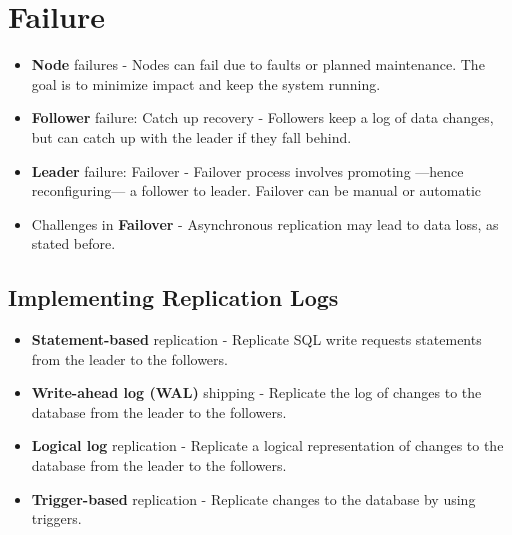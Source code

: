 \section{Failure}
\begin{itemize}
   \item \textbf{Node} failures - Nodes can fail due to faults or planned maintenance. The goal is to minimize impact and keep the system running.
   \item \textbf{Follower} failure: Catch up recovery - Followers keep a log of data changes, but can catch up with the leader if they fall behind.
   \item \textbf{Leader} failure: Failover - Failover process involves promoting ---hence reconfiguring--- a follower to leader. Failover can be manual or automatic
   \item Challenges in \textbf{Failover} - Asynchronous replication may lead to data loss, as stated before.
\end{itemize}

\subsection{Implementing Replication Logs}
\begin{itemize}
   \item \textbf{Statement-based} replication - Replicate SQL write requests statements from the leader to the followers.
   \item \textbf{Write-ahead log (WAL)} shipping - Replicate the log of changes to the database from the leader to the followers.
   \item \textbf{Logical log} replication - Replicate a logical representation of changes to the database from the leader to the followers.
   \item \textbf{Trigger-based} replication - Replicate changes to the database by using triggers.
\end{itemize}


